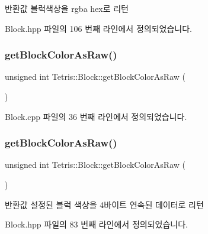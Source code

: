 \begin{DoxyReturn}{반환값}
블럭색상을 rgba hex로 리턴 
\end{DoxyReturn}


Block.\+hpp 파일의 106 번째 라인에서 정의되었습니다.

\mbox{\label{class_tetris_1_1_block_a8f6bd5020dcfdae501f74b42827344f3}} 
\subsubsection{\texorpdfstring{get\+Block\+Color\+As\+Raw()}{getBlockColorAsRaw()}\hspace{0.1cm}{\footnotesize\ttfamily [1/2]}}
{\footnotesize\ttfamily unsigned int Tetris\+::\+Block\+::get\+Block\+Color\+As\+Raw (\begin{DoxyParamCaption}{ }\end{DoxyParamCaption})}



Block.\+cpp 파일의 36 번째 라인에서 정의되었습니다.

\mbox{\label{class_tetris_1_1_block_a8f6bd5020dcfdae501f74b42827344f3}} 
\subsubsection{\texorpdfstring{get\+Block\+Color\+As\+Raw()}{getBlockColorAsRaw()}\hspace{0.1cm}{\footnotesize\ttfamily [2/2]}}
{\footnotesize\ttfamily unsigned int Tetris\+::\+Block\+::get\+Block\+Color\+As\+Raw (\begin{DoxyParamCaption}{ }\end{DoxyParamCaption})\hspace{0.3cm}{\ttfamily [inline]}}

\begin{DoxyReturn}{반환값}
설정된 블럭 색상을 4바이트 연속된 데이터로 리턴 
\end{DoxyReturn}


Block.\+hpp 파일의 83 번째 라인에서 정의되었습니다.

